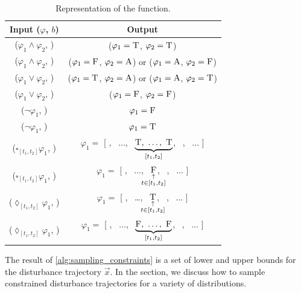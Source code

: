 \begin{table}
    \centering
    \caption{Representation of the  function.}
    \label{tab:inverse_propositions}
    \begin{tabular}{cc} 
        \toprule
        \textbf{Input ($\varphi$, $b$)} & \textbf{Output}  \\
        \midrule
        ($\varphi_1 \land \varphi_2$, \T) & ($\varphi_1 = \textsc{T}$, $\varphi_2 = \textsc{T}$) \\
        ($\varphi_1 \land \varphi_2$, \F) & ($\varphi_1 = \textsc{F}$, $\varphi_2 = \textsc{A}$) or ($\varphi_1 = \textsc{A}$, $\varphi_2 = \textsc{F}$) \\

        ($\varphi_1 \lor \varphi_2$, \T) & ($\varphi_1 = \textsc{T}$, $\varphi_2 = \textsc{A}$) or ($\varphi_1 = \textsc{A}$, $\varphi_2 = \textsc{T}$) \\ 
        ($\varphi_1 \lor \varphi_2$, \F) & ($\varphi_1 = \textsc{F}$, $\varphi_2 = \textsc{F}$) \\

        ($\neg \varphi_1$, \T) & $\varphi_1 = \textsc{F}$ \\ 
        ($\neg \varphi_1$, \F) & $\varphi_1 = \textsc{T}$ \\

        ($\square_{[t_1, t_2]} \varphi_1$, \T) & $\varphi_1 = $ [ \A, \ $\ldots$, \ $\underbrace{\T, \ \ldots, \ \T}_{[t_1,t_2]}$, \ \A, \  $\ldots$ ] \\
        ($\square_{[t_1, t_2]} \varphi_1$, \F)  & $\varphi_1 = $ [ \A, \ $\ldots$, \ $\underset{\substack{\uparrow\\\mathclap{t \in [t_1,t_2]}}}{\F}$, \ \A, \  $\ldots$ ]   \\

        ($\lozenge_{[t_1, t_2]}  \varphi_1$, \T) & $\varphi_1 = $ [ \A, \ \ldots, \ $\underset{\substack{\uparrow\\\mathclap{t \in [t_1,t_2]}}}{\T}$, \ \A, \  $\ldots$ ] \\
        ($\lozenge_{[t_1, t_2]} \varphi_1$, \F)  & $\varphi_1 = $ [ \A, \ $\ldots$, \ $\underbrace{\F, \ \ldots, \ \F}_{[t_1,t_2]}$, \ \A, \  $\ldots$ ] \\
        \bottomrule
    \end{tabular}
\end{table}

The result of \cref{alg:sampling_constraints} is a set of lower and upper bounds for the disturbance trajectory $\vec{x}$. In the section, we discuss how to sample constrained disturbance trajectories for a variety of distributions.




